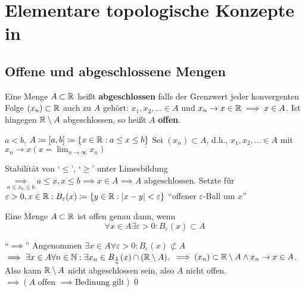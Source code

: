 \section{Elementare topologische Konzepte in }
\subsection{Offene und abgeschlossene Mengen}
\begin{subdefinition}
	Eine Menge $ A \subset \mathbb{R} $ heißt \textbf{abgeschlossen} falls der Grenzwert jeder konvergenten Folge $ (x_n) \subset \mathbb{R} $ auch zu $ A $ gehört: $ x_1, x_2, \dotsc \in A $ und $ x_n \to x \in \mathbb{R} \implies x \in A $. Ist hingegen $ \mathbb{R}\setminus A $ abgeschlossen, so heißt $ A $ \textbf{offen}.
\end{subdefinition}

\begin{subexample}
	$ a < b $, $ A \coloneqq [a, b] \coloneqq \{ x \in \mathbb{R} : a \leq x \leq b \} $
	Sei $ (x_n) \subset A $, d.h., $ x_1, x_2, \dotsc \in A $ mit $ x_n \to x ( x = \lim_{n\to\infty} x_n ) $
\end{subexample}
Stabilität von `$\leq$', `$\geq$' unter Limesbildung $ \underset{a\leq x_n \leq b }{\implies} a \leq x, x \leq b \implies x \in A \implies A \text{ abgeschlossen} $.
Setzte für $ \varepsilon > 0, x \in \mathbb{R}: B_{\varepsilon}(x) \coloneqq \{ y \in \mathbb{R} : | x - y | < \varepsilon \} $ ``offener $\varepsilon$-Ball um $x$''

\begin{sublemma}
	Eine Menge $ A \subset \mathbb{R} $ ist offen genau dann, wenn
	\[ \forall x \in A \exists \varepsilon > 0 : B_{\varepsilon} (x) \subset A \]
\end{sublemma}

\begin{subproof*}
	``$\implies$'' Angenommen $ \exists x \in A \forall \varepsilon > 0 : B_{\varepsilon}(x) \not\subset A $\\
	$\implies \exists x \in A \forall n \in \mathbb{N} : \exists x_n \in B_{\frac{1}{n}}(x) \cap ( \mathbb{R} \setminus A ).$
	$\implies (x_n) \subset \mathbb{R} \setminus A \wedge x_n \to x \in A $. Also kann $ \mathbb{R} \setminus A $ nicht abgeschlossen sein, also $A $ nicht offen. $ \implies ( A \text{ offen } \implies \text{Bedinung gilt} ) $\qed
\end{subproof*}

